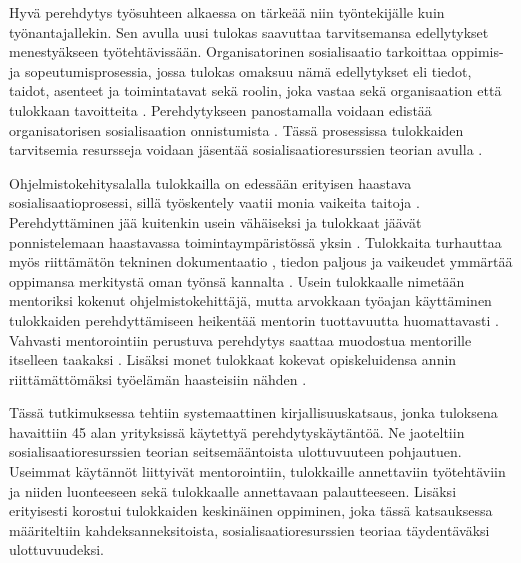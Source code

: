 \documentclass[utf8]{gradu3}
\begin{document}
Hyvä perehdytys työsuhteen alkaessa on tärkeää niin työntekijälle kuin työnantajallekin. Sen avulla uusi tulokas saavuttaa tarvitsemansa edellytykset menestyäkseen työtehtävissään. Organisatorinen sosialisaatio tarkoittaa oppimis- ja sopeutumisprosessia, jossa tulokas omaksuu nämä edellytykset eli tiedot, taidot, asenteet ja toimintatavat sekä roolin, joka vastaa sekä organisaation että tulokkaan tavoitteita %
\parencites%
    {wanberg-2012}%
    {chao-2012}%
\relax.
%
Perehdytykseen panostamalla voidaan edistää organisatorisen sosialisaation onnistumista %
\parencites%
    {saks-gruman-2012}%
    {bauer-ym-2007}%
    {wanberg-2012}%
\relax.
% 
Tässä prosessissa tulokkaiden tarvitsemia resursseja voidaan jäsentää sosialisaatioresurssien teorian avulla \parencite{saks-gruman-2012}.

Ohjelmistokehitysalalla tulokkailla on edessään erityisen haastava sosialisaatioprosessi, sillä työskentely vaatii monia vaikeita taitoja
%
\parencites%
    [][]{swebok}%
    {gregory-ym-2020}%
    {begel-simon-2008-all-over-again}%
\relax.
%
Perehdyttäminen jää kuitenkin usein vähäiseksi ja tulokkaat jäävät ponnistelemaan haastavassa toimintaympäristössä yksin %
\parencites%
    {buchan-ym-2019}%
    {dagenais-ym-2010}%
    {begel-simon-2008}%
\relax.
%
Tulokkaita turhauttaa myös riittämätön tekninen dokumentaatio \parencite{ju-ym-2021}, tiedon paljous ja vaikeudet ymmärtää oppimansa merkitystä oman työnsä kannalta \parencite{viviani-murphy-2019}. Usein tulokkaalle nimetään mentoriksi kokenut ohjelmistokehittäjä, mutta arvokkaan työajan käyttäminen tulokkaiden perehdyttämiseen heikentää mentorin tuottavuutta huomattavasti \parencite{medeiros-2021}. Vahvasti mentorointiin perustuva perehdytys saattaa muodostua mentorille itselleen taakaksi \parencite{viviani-murphy-2019}. Lisäksi monet tulokkaat kokevat opiskeluidensa annin riittämättömäksi työelämän haasteisiin nähden \parencite{craig-ym-2018}.

Tässä tutkimuksessa tehtiin systemaattinen kirjallisuuskatsaus, jonka tuloksena havaittiin 45 alan yrityksissä käytettyä perehdytyskäytäntöä. Ne jaoteltiin sosialisaatioresurssien teorian \textcite{saks-gruman-2012} seitsemääntoista ulottuvuuteen pohjautuen. Useimmat käytännöt liittyivät mentorointiin, tulokkaille annettaviin työtehtäviin ja niiden luonteeseen sekä tulokkaalle annettavaan palautteeseen. Lisäksi erityisesti korostui tulokkaiden keskinäinen oppiminen, joka tässä katsauksessa määriteltiin kahdeksanneksitoista, sosialisaatioresurssien teoriaa täydentäväksi ulottuvuudeksi.
\end{document}

